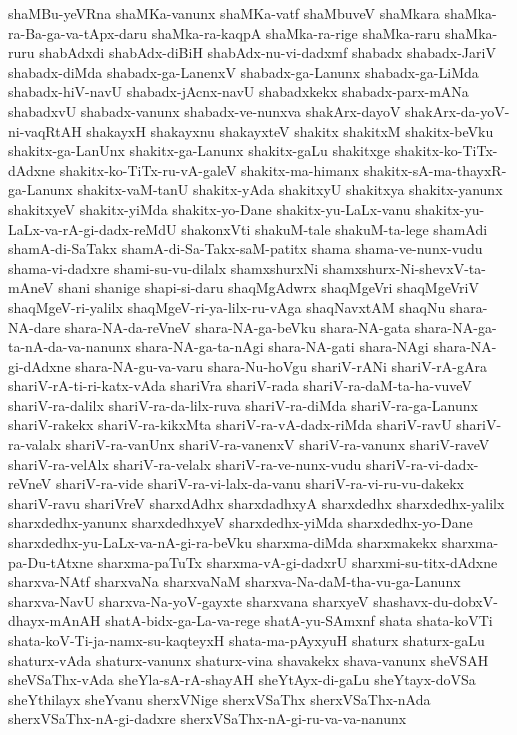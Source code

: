 {shaMBu-yeVRna
shaMKa-vanunx
shaMKa-vatf
shaMbuveV
shaMkara
shaMka-ra-Ba-ga-va-tApx-daru
shaMka-ra-kaqpA
shaMka-ra-rige
shaMka-raru
shaMka-ruru
shabAdxdi
shabAdx-diBiH
shabAdx-nu-vi-dadxmf
shabadx
shabadx-JariV
shabadx-diMda
shabadx-ga-LanenxV
shabadx-ga-Lanunx
shabadx-ga-LiMda
shabadx-hiV-navU
shabadx-jAcnx-navU
shabadxkekx
shabadx-parx-mANa
shabadxvU
shabadx-vanunx
shabadx-ve-nunxva
shakArx-dayoV
shakArx-da-yoV-ni-vaqRtAH
shakayxH
shakayxnu
shakayxteV
shakitx
shakitxM
shakitx-beVku
shakitx-ga-LanUnx
shakitx-ga-Lanunx
shakitx-gaLu
shakitxge
shakitx-ko-TiTx-dAdxne
shakitx-ko-TiTx-ru-vA-galeV
shakitx-ma-himanx
shakitx-sA-ma-thayxR-ga-Lanunx
shakitx-vaM-tanU
shakitx-yAda
shakitxyU
shakitxya
shakitx-yanunx
shakitxyeV
shakitx-yiMda
shakitx-yo-Dane
shakitx-yu-LaLx-vanu
shakitx-yu-LaLx-va-rA-gi-dadx-reMdU
shakonxVti
shakuM-tale
shakuM-ta-lege
shamAdi
shamA-di-SaTakx
shamA-di-Sa-Takx-saM-patitx
shama
shama-ve-nunx-vudu
shama-vi-dadxre
shami-su-vu-dilalx
shamxshurxNi
shamxshurx-Ni-shevxV-ta-mAneV
shani
shanige
shapi-si-daru
shaqMgAdwrx
shaqMgeVri
shaqMgeVriV
shaqMgeV-ri-yalilx
shaqMgeV-ri-ya-lilx-ru-vAga
shaqNavxtAM
shaqNu
shara-NA-dare
shara-NA-da-reVneV
shara-NA-ga-beVku
shara-NA-gata
shara-NA-ga-ta-nA-da-va-nanunx
shara-NA-ga-ta-nAgi
shara-NA-gati
shara-NAgi
shara-NA-gi-dAdxne
shara-NA-gu-va-varu
shara-Nu-hoVgu
shariV-rANi
shariV-rA-gAra
shariV-rA-ti-ri-katx-vAda
shariVra
shariV-rada
shariV-ra-daM-ta-ha-vuveV
shariV-ra-dalilx
shariV-ra-da-lilx-ruva
shariV-ra-diMda
shariV-ra-ga-Lanunx
shariV-rakekx
shariV-ra-kikxMta
shariV-ra-vA-dadx-riMda
shariV-ravU
shariV-ra-valalx
shariV-ra-vanUnx
shariV-ra-vanenxV
shariV-ra-vanunx
shariV-raveV
shariV-ra-velAlx
shariV-ra-velalx
shariV-ra-ve-nunx-vudu
shariV-ra-vi-dadx-reVneV
shariV-ra-vide
shariV-ra-vi-lalx-da-vanu
shariV-ra-vi-ru-vu-dakekx
shariV-ravu
shariVreV
sharxdAdhx
sharxdadhxyA
sharxdedhx
sharxdedhx-yalilx
sharxdedhx-yanunx
sharxdedhxyeV
sharxdedhx-yiMda
sharxdedhx-yo-Dane
sharxdedhx-yu-LaLx-va-nA-gi-ra-beVku
sharxma-diMda
sharxmakekx
sharxma-pa-Du-tAtxne
sharxma-paTuTx
sharxma-vA-gi-dadxrU
sharxmi-su-titx-dAdxne
sharxva-NAtf
sharxvaNa
sharxvaNaM
sharxva-Na-daM-tha-vu-ga-Lanunx
sharxva-NavU
sharxva-Na-yoV-gayxte
sharxvana
sharxyeV
shashavx-du-dobxV-dhayx-mAnAH
shatA-bidx-ga-La-va-rege
shatA-yu-SAmxnf
shata
shata-koVTi
shata-koV-Ti-ja-namx-su-kaqteyxH
shata-ma-pAyxyuH
shaturx
shaturx-gaLu
shaturx-vAda
shaturx-vanunx
shaturx-vina
shavakekx
shava-vanunx
sheVSAH
sheVSaThx-vAda
sheYla-sA-rA-shayAH
sheYtAyx-di-gaLu
sheYtayx-doVSa
sheYthilayx
sheYvanu
sherxVNige
sherxVSaThx
sherxVSaThx-nAda
sherxVSaThx-nA-gi-dadxre
sherxVSaThx-nA-gi-ru-va-va-nanunx
}
